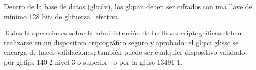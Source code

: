 {
  Dentro de la base de datos (\gls{gl:cdv}), los \gls{gl:pan} deben ser
  cifrados con una llave de mínimo 128 bits de \gls{gl:fuerza_efectiva}.
}

{
  Todas la operaciones sobre la administración de las llaves criptográficas
  deben realizarse en un dispositivo criptográfico seguro y aprobado: el
  \gls{gl:pci} \gls{gl:ssc} se encarga de hacer validaciones; también puede ser
  cualquier dispositivo validado por \gls{gl:fips} 140-2 nivel 3 o
  superior~\cite{nist_modulos_criptograficos} o por la \gls{gl:iso} 13491-1.
}
